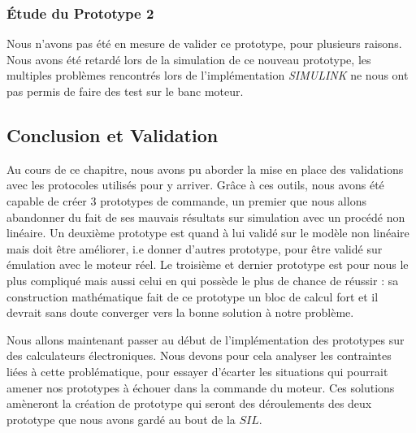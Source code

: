 \subsubsection{Étude du Prototype 2}
Nous n'avons pas été en mesure de valider ce prototype, pour plusieurs raisons. Nous avons été retardé lors de la simulation de ce nouveau prototype, les multiples problèmes rencontrés lors de l'implémentation \emph{SIMULINK} ne nous ont pas permis de faire des test sur le banc moteur. 

\subsection{Conclusion et Validation}
Au cours de ce chapitre, nous avons pu aborder la mise en place des validations avec les protocoles utilisés pour y arriver. Grâce à ces outils, nous avons été capable de créer 3 prototypes de commande, un premier que nous allons abandonner du fait de ses mauvais résultats sur simulation avec un procédé non linéaire. Un deuxième prototype est quand à lui validé sur le modèle non linéaire mais doit être améliorer, i.e donner d'autres prototype, pour être validé sur émulation avec le moteur réel. Le troisième et dernier prototype est pour nous le plus compliqué mais aussi celui en qui possède le plus de chance de réussir : sa construction mathématique fait de ce prototype un bloc de calcul fort et il devrait sans doute converger vers la bonne solution à notre problème.


Nous allons maintenant passer au début de l'implémentation des prototypes sur des calculateurs électroniques. Nous devons pour cela analyser les contraintes liées à cette problématique, pour essayer d'écarter les situations qui pourrait amener nos prototypes à échouer dans la commande du moteur. Ces solutions amèneront la création de prototype qui seront des déroulements des deux prototype que nous avons gardé au bout de la $SIL$.






